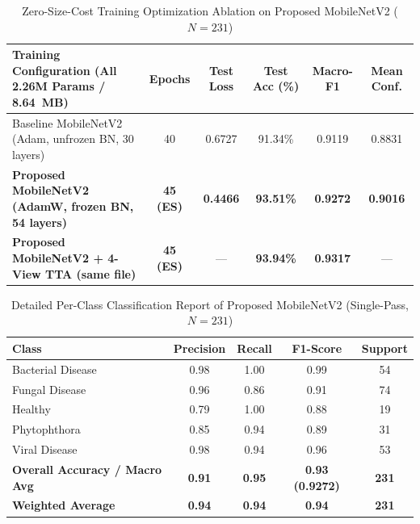 \begin{table}[htbp]
\caption{Zero-Size-Cost Training Optimization Ablation on Proposed MobileNetV2 ($N = 231$)}
\label{tab:ft_ablation}
\begin{center}
\begin{tabularx}{\textwidth}{| X | c | c | c | c | c |}
\hline
\textbf{Training Configuration (All 2.26M Params / 8.64~MB)} & \textbf{Epochs} & \textbf{Test Loss} & \textbf{Test Acc (\%)} & \textbf{Macro-F1} & \textbf{Mean Conf.} \\
\hline
Baseline MobileNetV2 (Adam, unfrozen BN, 30 layers) & 40 & 0.6727 & 91.34\% & 0.9119 & 0.8831 \\
\hline
\textbf{Proposed MobileNetV2 (AdamW, frozen BN, 54 layers)} & \textbf{45 (ES)} & \textbf{0.4466} & \textbf{93.51\%} & \textbf{0.9272} & \textbf{0.9016} \\
\hline
\textbf{Proposed MobileNetV2 + 4-View TTA (same file)} & \textbf{45 (ES)} & --- & \textbf{93.94\%} & \textbf{0.9317} & --- \\
\hline
\end{tabularx}
\end{center}
\end{table}

\begin{table}[htbp]
\caption{Detailed Per-Class Classification Report of Proposed MobileNetV2 (Single-Pass, $N = 231$)}
\label{tab:02_per_class}
\begin{center}
\begin{tabularx}{\textwidth}{| X | c | c | c | c |}
\hline
\textbf{Class} & \textbf{Precision} & \textbf{Recall} & \textbf{F1-Score} & \textbf{Support} \\
\hline
Bacterial Disease & 0.98 & 1.00 & 0.99 & 54 \\
\hline
Fungal Disease & 0.96 & 0.86 & 0.91 & 74 \\
\hline
Healthy & 0.79 & 1.00 & 0.88 & 19 \\
\hline
Phytophthora & 0.85 & 0.94 & 0.89 & 31 \\
\hline
Viral Disease & 0.98 & 0.94 & 0.96 & 53 \\
\hline
\textbf{Overall Accuracy / Macro Avg} & \textbf{0.91} & \textbf{0.95} & \textbf{0.93 (0.9272)} & \textbf{231} \\
\hline
\textbf{Weighted Average} & \textbf{0.94} & \textbf{0.94} & \textbf{0.94} & \textbf{231} \\
\hline
\end{tabularx}
\end{center}
\end{table}

